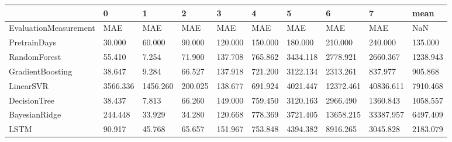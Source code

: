 \begin{tabular}{llllllllll}
\toprule
{} &        0 &        1 &       2 &       3 &       4 &        5 &         6 &         7 &     mean \\
\midrule
EvaluationMeasurement &      MAE &      MAE &     MAE &     MAE &     MAE &      MAE &       MAE &       MAE &      NaN \\
PretrainDays          &   30.000 &   60.000 &  90.000 & 120.000 & 150.000 &  180.000 &   210.000 &   240.000 &  135.000 \\
RandomForest          &   55.410 &    7.254 &  71.900 & 137.708 & 765.862 & 3434.118 &  2778.921 &  2660.367 & 1238.943 \\
GradientBoosting      &   38.647 &    9.284 &  66.527 & 137.918 & 721.200 & 3122.134 &  2313.261 &   837.977 &  905.868 \\
LinearSVR             & 3566.336 & 1456.260 & 200.025 & 138.677 & 691.924 & 4021.447 & 12372.461 & 40836.611 & 7910.468 \\
DecisionTree          &   38.437 &    7.813 &  66.260 & 149.000 & 759.450 & 3120.163 &  2966.490 &  1360.843 & 1058.557 \\
BayesianRidge         &  244.448 &   33.929 &  34.280 & 120.668 & 778.369 & 3721.405 & 13658.215 & 33387.957 & 6497.409 \\
LSTM                  &   90.917 &   45.768 &  65.657 & 151.967 & 753.848 & 4394.382 &  8916.265 &  3045.828 & 2183.079 \\
\bottomrule
\end{tabular}
